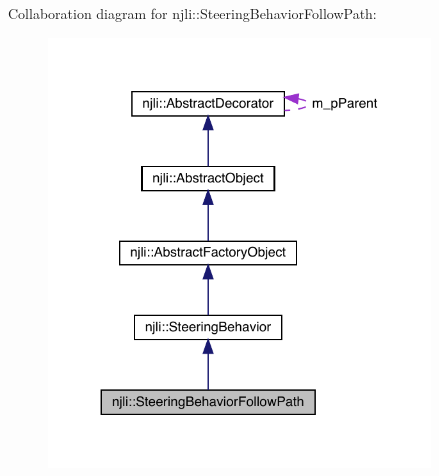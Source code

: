 Collaboration diagram for njli\+:\+:Steering\+Behavior\+Follow\+Path\+:\nopagebreak
\begin{figure}[H]
\begin{center}
\leavevmode
\includegraphics[width=287pt]{classnjli_1_1_steering_behavior_follow_path__coll__graph}
\end{center}
\end{figure}
